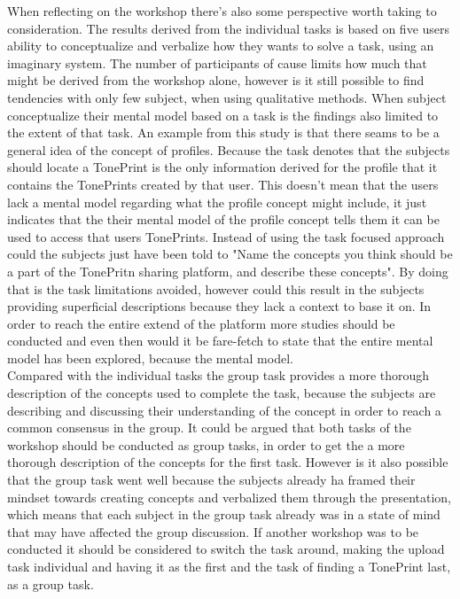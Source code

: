 When reflecting on the workshop there's also some perspective worth taking to consideration. The results derived from the individual tasks is based on five users ability to conceptualize and verbalize how they wants to solve a task, using an imaginary system. The number of participants of cause limits how much that might be derived from the workshop alone, however is it still possible to find tendencies with only few subject, when using qualitative methods. When subject conceptualize their mental model based on a task is the findings also limited to the extent of that task. An example from this study is that there seams to be a general idea of the concept of profiles. Because the task denotes that the subjects should locate a TonePrint is the only information derived for the profile that it contains the TonePrints created by that user. This doesn't mean that the users lack a mental model regarding what the profile concept might include, it just indicates that the their mental model of the profile concept tells them it can be used to access that users TonePrints. Instead of using the task focused approach could the subjects just have been told to "Name the concepts you think should be a part of the TonePritn sharing platform, and describe these concepts". By doing that is the task limitations avoided, however could this result in the subjects providing superficial descriptions because they lack a context to base it on. In order to reach the entire extend of the platform more studies should be conducted and even then would it be fare-fetch to state that the entire mental model has been explored, because the mental model. \\
Compared with the individual tasks the group task provides a more thorough description of the concepts used to complete the task, because the subjects are describing and discussing their understanding of the concept in order to reach a common consensus in the group. It could be argued that both tasks of the workshop should be conducted as group tasks, in order to get the a more thorough description of the concepts for the first task. However is it also possible that the group task went well because the subjects already ha framed their mindset towards creating concepts and verbalized them through the presentation, which means that each subject in the group task already was in a state of mind that may have affected the group discussion. If another workshop was to be conducted it should be considered to switch the task around, making the upload task individual and having it as the first and the task of finding a TonePrint last, as a group task.\\

